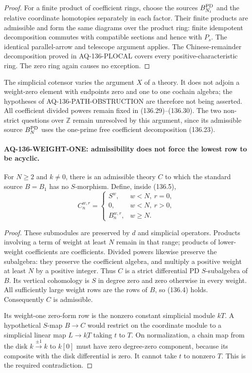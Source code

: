 \documentclass[11pt,a4paper]{article}
\theoremstyle{definition}\newtheorem{definition}[theorem]{Definition}
\theoremstyle{remark}\newtheorem{remark}[theorem]{Remark}
\begin{document}
\begin{proof}
For a finite product of coefficient rings, choose the
sources $B_{N_i}^{\rm PD}$ and the relative coordinate
homotopies separately in each factor.  Their finite
products are admissible and form the same diagrams over
the product ring: finite idempotent decomposition
commutes with compatible sections and hence with
$P_s$.  The identical parallel-arrow and telescope
argument applies.  The Chinese-remainder decomposition
proved in AQ-136-PLOCAL covers every positive-characteristic
ring.  The zero ring again causes no exception.
\end{proof}

The simplicial cotensor varies the argument $X$ of a
theory.  It does not adjoin a weight-zero element with
endpoints zero and one to one cochain algebra; the
hypotheses of AQ-136-PATH-OBSTRUCTION are therefore
not being asserted.  All coefficient divided powers
remain fixed in (136.29)--(136.30).
The two non-strict questions over $\mathbb Z$ remain
unresolved by this argument, since its admissible
source $B_N^{\rm PD}$ uses the one-prime free coefficient
decomposition (136.23).

\paragraph{AQ-136-WEIGHT-ONE: admissibility does not force the lowest row to be acyclic.}
For $N\geq2$ and $k\ne0$, there is an admissible theory
$C$ to which the standard source $B=B_1$ has no
$S$-morphism.  Define, inside (136.5),
\[
 C^{w,r}_n=
 \begin{cases}
 S^w,&w<N,\ r=0,\\
 0,&w<N,\ r>0,\\
 B^{w,r}_n,&w\geq N.
 \end{cases}                                               \tag{136.31}
\]

\begin{proof}
These submodules are preserved by $d$ and simplicial
operators.  Products involving a term of weight at
least $N$ remain in that range; products of lower-weight
coefficients are coefficients.  Divided powers likewise
preserve the subalgebra: they preserve the coefficient
algebra, and multiply a positive weight at least $N$
by a positive integer.  Thus $C$ is a strict differential
PD $S$-subalgebra of $B$.
Its vertical cohomology is $S$ in degree zero and zero
otherwise in every weight.  All sufficiently large
weight rows are the rows of $B$, so (136.4) holds.
Consequently $C$ is admissible.

Its weight-one zero-form row is the nonzero constant
simplicial module $kT$.  A hypothetical $S$-map
$B\to C$ would restrict on the coordinate module to
a simplicial linear map $L\to\underline{kT}$ taking
$t$ to $T$.  On normalization, a chain map from the
disk $k\xrightarrow{\pm1}k$ to $k[0]$ must have zero
degree-zero component, because its composite with
the disk differential is zero.  It cannot take $t$
to nonzero $T$.  This is the required contradiction.
\end{proof}
\end{document}

